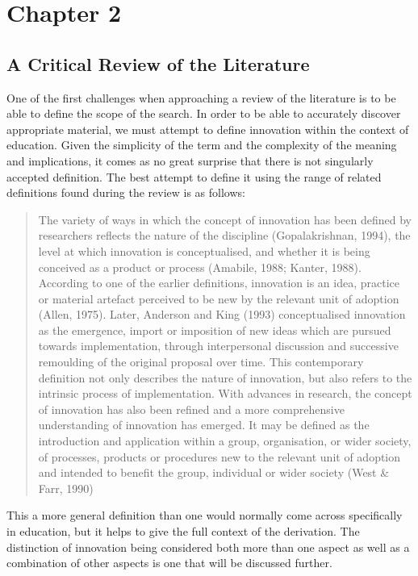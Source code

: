 \section{Chapter 2}
\subsection{A Critical Review of the Literature}
One of the first challenges when approaching a review of the literature is to be able to define the scope of the search. In order to be able to accurately discover appropriate material, we must attempt to define innovation within the context of education. Given the simplicity of the term and the complexity of the meaning and implications, it comes as no great surprise that there is not singularly accepted definition. The best attempt to define it using the range of related definitions found during the review is as follows:

\begin{quote}
The variety of ways in which the concept of innovation has been defined by researchers reflects the nature of the discipline (Gopalakrishnan, 1994), the level at which innovation is conceptualised, and whether it is being conceived as a product or process (Amabile, 1988; Kanter, 1988). According to one of the earlier definitions, innovation is an idea, practice or material artefact perceived to be new by the relevant unit of adoption (Allen, 1975). Later, Anderson and King (1993) conceptualised innovation as the emergence, import or imposition of new ideas which are pursued towards implementation, through interpersonal discussion and successive remoulding of the original proposal over time. This contemporary definition not only describes the nature of innovation, but also refers to the intrinsic process of implementation. With advances in research, the concept of innovation has also been refined and a more comprehensive understanding of innovation has emerged. It may be defined as the introduction and application within a group, organisation, or wider society, of processes, products or procedures new to the relevant unit of adoption and intended to benefit the group, individual or wider society (West \& Farr, 1990)
\end{quote}
\cite{Sharma_2005}

This a more general definition than one would normally come across specifically in education, but it helps to give the full context of the derivation. The distinction of innovation being considered both more than one aspect as well as a combination of other aspects is one that will be discussed further.


